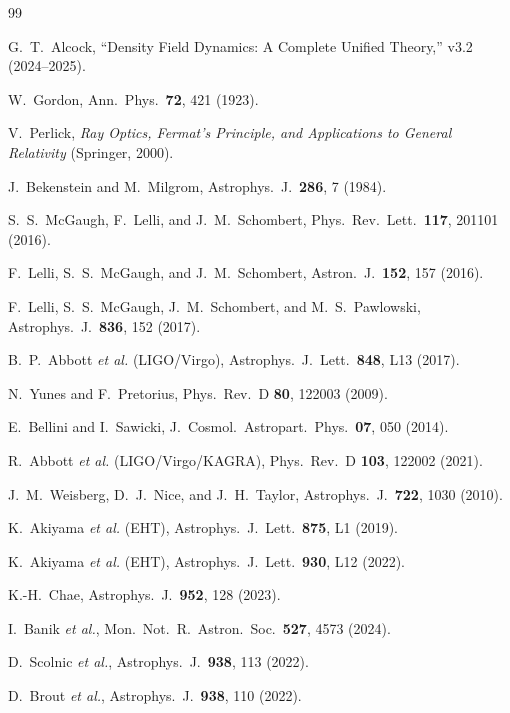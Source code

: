 \documentclass[aps,prd,twocolumn,superscriptaddress,nofootinbib]{revtex4-2}
\begin{document}
\begin{thebibliography}{99}

G.~T.~Alcock,
``Density Field Dynamics: A Complete Unified Theory,''
v3.2 (2024--2025).

W.~Gordon,
Ann.\ Phys.\ \textbf{72}, 421 (1923).

V.~Perlick,
\textit{Ray Optics, Fermat's Principle, and Applications to General
Relativity} (Springer, 2000).

J.~Bekenstein and M.~Milgrom,
Astrophys.\ J.\ \textbf{286}, 7 (1984).

S.~S.~McGaugh, F.~Lelli, and J.~M.~Schombert,
Phys.\ Rev.\ Lett.\ \textbf{117}, 201101 (2016).

F.~Lelli, S.~S.~McGaugh, and J.~M.~Schombert,
Astron.\ J.\ \textbf{152}, 157 (2016).

F.~Lelli, S.~S.~McGaugh, J.~M.~Schombert, and M.~S.~Pawlowski,
Astrophys.\ J.\ \textbf{836}, 152 (2017).

B.~P.~Abbott \textit{et al.} (LIGO/Virgo),
Astrophys.\ J.\ Lett.\ \textbf{848}, L13 (2017).

N.~Yunes and F.~Pretorius,
Phys.\ Rev.\ D \textbf{80}, 122003 (2009).

E.~Bellini and I.~Sawicki,
J.\ Cosmol.\ Astropart.\ Phys.\ \textbf{07}, 050 (2014).

R.~Abbott \textit{et al.} (LIGO/Virgo/KAGRA),
Phys.\ Rev.\ D \textbf{103}, 122002 (2021).

J.~M.~Weisberg, D.~J.~Nice, and J.~H.~Taylor,
Astrophys.\ J.\ \textbf{722}, 1030 (2010).

K.~Akiyama \textit{et al.} (EHT),
Astrophys.\ J.\ Lett.\ \textbf{875}, L1 (2019).

K.~Akiyama \textit{et al.} (EHT),
Astrophys.\ J.\ Lett.\ \textbf{930}, L12 (2022).

K.-H.~Chae,
Astrophys.\ J.\ \textbf{952}, 128 (2023).

I.~Banik \textit{et al.},
Mon.\ Not.\ R.\ Astron.\ Soc.\ \textbf{527}, 4573 (2024).

D.~Scolnic \textit{et al.},
Astrophys.\ J.\ \textbf{938}, 113 (2022).

D.~Brout \textit{et al.},
Astrophys.\ J.\ \textbf{938}, 110 (2022).


\end{thebibliography}
\end{document}
